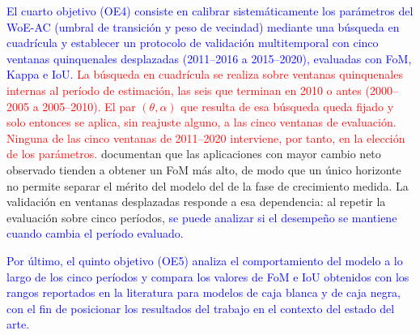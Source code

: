 \textcolor{blue}{El cuarto objetivo (OE4) consiste en calibrar sistemáticamente los parámetros del WoE-AC (umbral de transición y peso de vecindad) mediante una búsqueda en cuadrícula y establecer un protocolo de validación multitemporal con cinco ventanas quinquenales desplazadas (2011--2016 a 2015--2020), evaluadas con FoM, Kappa e IoU.} \textcolor{red}{La búsqueda en cuadrícula se realiza sobre ventanas quinquenales internas al período de estimación, las seis que terminan en 2010 o antes (2000--2005 a 2005--2010). El par $(\theta, \alpha)$ que resulta de esa búsqueda queda fijado y solo entonces se aplica, sin reajuste alguno, a las cinco ventanas de evaluación. Ninguna de las cinco ventanas de 2011--2020 interviene, por tanto, en la elección de los parámetros.} \textcite{pontius2008comparing} documentan que las aplicaciones con mayor cambio neto observado tienden a obtener un FoM más alto, de modo que un único horizonte no permite separar el mérito del modelo del de la fase de crecimiento medida. La validación en ventanas desplazadas responde a esa dependencia: al repetir la evaluación sobre cinco períodos, \textcolor{blue}{se puede analizar si el desempeño se mantiene cuando cambia el período evaluado.}



\textcolor{blue}{Por último, el quinto objetivo (OE5) analiza el comportamiento del modelo a lo largo de los cinco períodos y compara los valores de FoM e IoU obtenidos con los rangos reportados en la literatura para modelos de caja blanca y de caja negra, con el fin de posicionar los resultados del trabajo en el contexto del estado del arte.}


